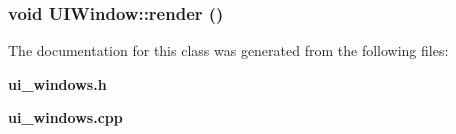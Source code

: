 \subsubsection{\setlength{\rightskip}{0pt plus 5cm}void UIWindow::render ()}\label{classEngine_1_1UIWindow_46a1d834ac52c7ec31087b5b6ecc12cc}




The documentation for this class was generated from the following files:\begin{CompactItemize}
\item 
{\bf ui\_\-windows.h}\item 
{\bf ui\_\-windows.cpp}\end{CompactItemize}
